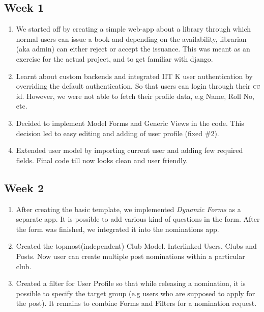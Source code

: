 \documentclass[12pt,a4paper]{scrartcl}
\begin{document}
\subsection{Week 1}
\begin{enumerate}
	\item We started off by creating a simple web-app about a library through which normal users can issue a book and depending on the availability, librarian (aka admin) can either reject or accept the issuance. This was meant as an exercise for the actual project, and to get familiar with django.
	\item Learnt about custom backends and integrated IIT K user authentication by overriding the default authentication. So that users can login through their \textsc{cc} id. However, we were not able to fetch their profile data, e.g Name, Roll No, etc.
	\item Decided to implement Model Forms and Generic Views in the code. This decision led to easy editing and adding of user profile (fixed \#2).
	\item Extended user model by importing current user and adding few required fields. Final code till now looks clean and user friendly.
\end{enumerate}

\subsection{Week 2}
\begin{enumerate}
	\item After creating the basic template, we implemented \textit{Dynamic Forms} as a separate app. It is possible to add various kind of questions in the form. After the form was finished, we integrated it into the nominations app. 
	\item Created the topmost(independent) Club Model. Interlinked Users, Clubs and Posts. Now user can create multiple post nominations within a particular club. 
	\item Created a filter for User Profile so that while releasing a nomination, it is possible to specify the target group (e.g users who are supposed to apply for the post). It remains to combine Forms and Filters for a nomination request.
\end{enumerate}
\end{document}
